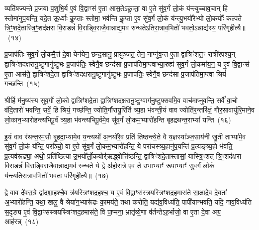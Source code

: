 व्यति॑षज्यन्ते प्र॒जया॑ प॒शुभि॒र्य ए॒वं वि॒द्वाꣳस॑ ए॒ता आस॒ते\-ऽकॢ॑प्ता॒ वा ए॒ते सु॑व॒र्गं लो॒कं य॑न्त्युच्चाव॒चान् हि स्तोमा॑नुप॒यन्ति॒ यदे॒त ऊ॒र्ध्वाः कॢ॒प्ताः स्तोमा॒ भव॑न्ति कॢ॒प्ता ए॒व सु॑व॒र्गं लो॒कं य॑न्त्यु॒भयो॑रेभ्यो लो॒कयोः᳚ कल्पते त्रि॒ꣳ॒शदे॒तास्त्रि॒ꣳ॒शद॑क्षरा वि॒राडन्नं॑ वि॒राड्वि॒राजै॒वान्नाद्य॒मव॑ रुन्धते\-ऽतिरा॒त्राव॒भितो॑ भवतो॒\-ऽन्नाद्य॑स्य॒ परि॑गृहीत्यै॥~(१४)

{\anuvakamend[{ओष॑धीः संवथ्स॒र ए॒वाव॑ प्रति॒ष्ठाय॒ व्यति॑ष॒क्तैका॒न्नप॑ञ्चा॒शच्च॑}]}%

प्र॒जा\-प॑तिः सुव॒र्गं लो॒कमै॒त्तं दे॒वा येन॑येन॒ छन्द॒सानु॒ प्रायु॑ञ्जत॒ तेन॒ नाप्नु॑व॒न्त ए॒ता द्वात्रिꣳ॑शत॒ꣳ॒ रात्री॑रपश्य॒न् द्वात्रिꣳ॑शदक्षरानु॒ष्टुगानु॑ष्टुभः प्र॒जा\-प॑तिः॒ स्वेनै॒व छन्द॑सा प्र॒जा\-प॑तिमा॒प्त्वाभ्या॒रुह्य॑ सुव॒र्गं लो॒कमा॑य॒न्॒ य ए॒वं वि॒द्वाꣳस॑ ए॒ता आस॑ते॒ द्वात्रिꣳ॑शदे॒ता द्वात्रिꣳ॑शदक्षरानु॒ष्टुगानु॑ष्टुभः प्र॒जा\-प॑तिः॒ स्वेनै॒व छन्द॑सा प्र॒जा\-प॑तिमा॒प्त्वा श्रियं॑ गच्छन्ति~(१५)

श्रीर्\mbox{}हि म॑नु॒ष्य॑स्य सुव॒र्गो लो॒को द्वात्रिꣳ॑शदे॒ता द्वात्रिꣳ॑शदक्षरानु॒ष्टुग्वाग॑नु॒ष्टुफ्सर्वा॑मे॒व वाच॑माप्नुवन्ति॒ सर्वे॑ वा॒चो व॑दि॒तारो॑ भवन्ति॒ सर्वे॒ हि श्रियं॒ गच्छ॑न्ति॒ ज्योति॒र्गौरायु॒रिति॑ त्र्य॒हा भ॑वन्ती॒यं वाव ज्योति॑र॒न्तरि॑क्षं॒ गौर॒सावायु॑\-रि॒माने॒व लो॒कान॒भ्यारो॑हन्त्यभिपू॒र्वं त्र्य॒हा भ॑वन्त्यभिपू॒र्वमे॒व सु॑व॒र्गं लो॒कम॒भ्यारो॑हन्ति बृहद्रथन्त॒रा\-भ्यां᳚ यन्ति~(१६)

इ॒यं वाव र॑थन्त॒रम॒सौ बृ॒हदा॒भ्यामे॒व य॒न्त्यथो॑ अ॒नयो॑रे॒व प्रति॑ तिष्ठन्त्ये॒ते वै य॒ज्ञस्या᳚ञ्ज॒साय॑नी स्रु॒ती ताभ्या॑मे॒व सु॑व॒र्गं लो॒कं य॑न्ति॒ परा᳚ञ्चो॒ वा ए॒ते सु॑व॒र्गं लो॒कम॒भ्यारो॑हन्ति॒ ये परा॑चस्त्र्य॒हानु॑प॒यन्ति॑ प्र॒त्यङ्त्र्य॒हो भ॑वति॒ प्र॒त्यव॑रूढ्या॒ अथो॒ प्रति॑ष्ठित्या उ॒भयो᳚र्लो॒कयोर्॑\mbox{}॑ऋद्ध्वोत्ति॑ष्ठन्ति॒ द्वात्रिꣳ॑शदे॒तास्तासां॒ यास्त्रि॒ꣳ॒शत् त्रि॒ꣳ॒शद॑क्षरा वि॒राडन्नं॑ वि॒राड्वि॒राजै॒वान्नाद्य॒मव॑ रुन्धते॒ ये द्वे अ॑होरा॒त्रे ए॒व ते उ॒भाभ्याꣳ॑ रू॒पाभ्याꣳ॑ सुव॒र्गं लो॒कं य॑न्त्यतिरा॒त्राव॒भितो॑ भवतः॒ परि॑गृहीत्यै॥~(१७)

{\anuvakamend[{ग॒च्छ॒न्ति॒ य॒न्ति॒ त्रि॒ꣳ॒शद॑क्षरा॒ द्वाविꣳ॑शतिश्च}]}%

द्वे वाव दे॑वस॒त्रे द्वा॑दशा॒हश्चै॒व त्र॑यस्त्रिꣳशद॒हश्च॒ य ए॒वं वि॒द्वाꣳस॑स्त्रयस्त्रिꣳशद॒हमास॑ते सा॒क्षादे॒व दे॒वता॑ अ॒भ्यारो॑हन्ति॒ यथा॒ खलु॒ वै श्रेया॑न॒भ्यारू॑ढः का॒मय॑ते॒ तथा॑ करोति॒ यद्य॑व॒विध्य॑ति॒ पापी॑यान्भवति॒ यदि॒ नाव॒विध्य॑ति स॒दृङ्य ए॒वं वि॒द्वाꣳस॑स्त्रयस्त्रिꣳशद॒हमास॑ते॒ वि पा॒प्मना॒ भ्रातृ॑व्ये॒णा व॑र्तन्ते\-ऽह॒र्भाजो॒ वा ए॒ता दे॒वा अग्र॒ आह॑रन्न्~(१८)

